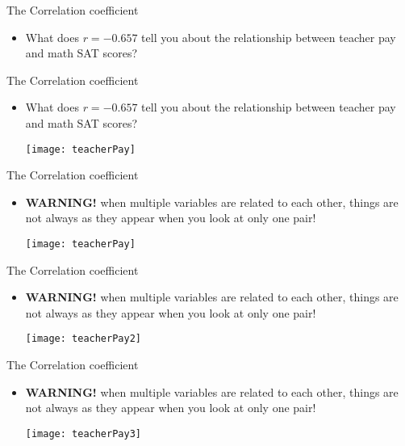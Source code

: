 \documentclass[xcolor=dvipsnames]{beamer}
\begin{document}
\begin{frame}{The Correlation coefficient}
	\begin{itemize}
		\item What does $r = -0.657$ tell you about the relationship between teacher pay and math SAT scores?
	\end{itemize}
\end{frame}

\begin{frame}{The Correlation coefficient}
	\begin{itemize}
		\item What does $r = -0.657$ tell you about the relationship between teacher pay and math SAT scores?
		\begin{center}
			\texttt{[image: teacherPay]}
		\end{center}
	\end{itemize}
\end{frame}

\begin{frame}{The Correlation coefficient}
	\begin{itemize}
		\item \textbf{WARNING!} when multiple variables are related to each other, things are not always as they appear when you look at only one pair!
		\begin{center}
			\texttt{[image: teacherPay]}
		\end{center}
	\end{itemize}
\end{frame}

\begin{frame}{The Correlation coefficient}
	\begin{itemize}
		\item \textbf{WARNING!} when multiple variables are related to each other, things are not always as they appear when you look at only one pair!
		\begin{center}
			\texttt{[image: teacherPay2]}
		\end{center}
	\end{itemize}
\end{frame}

\begin{frame}{The Correlation coefficient}
	\begin{itemize}
		\item \textbf{WARNING!} when multiple variables are related to each other, things are not always as they appear when you look at only one pair!
		\begin{center}
			\texttt{[image: teacherPay3]}
		\end{center}
	\end{itemize}
\end{frame}
\end{document}
